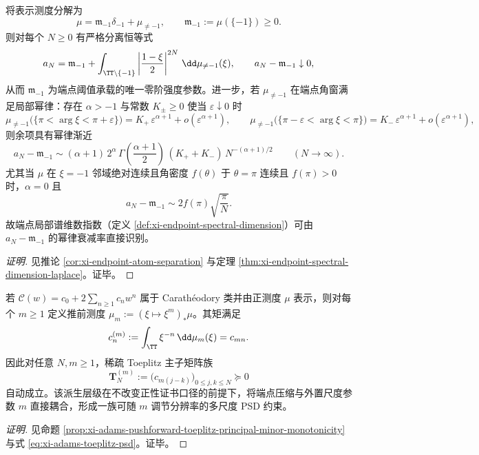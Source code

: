 \begin{conclusion}\label{con:xi-terminal-endpoint-threshold-spectral-dimension}
将表示测度分解为
\[
\mu=\mathfrak m_{-1}\delta_{-1}+\mu_{\neq -1},
\qquad
\mathfrak m_{-1}:=\mu(\{-1\})\ge 0.
\]
则对每个 \(N\ge 0\) 有严格分离恒等式
\[
a_N=\mathfrak m_{-1}+\int_{\TT\setminus\{-1\}}\left|\frac{1-\xi}{2}\right|^{2N}\,\dd\mu_{\neq-1}(\xi),
\qquad
a_N-\mathfrak m_{-1}\downarrow 0,
\]
从而 \(\mathfrak m_{-1}\) 为端点阈值承载的唯一零阶强度参数。进一步，若 \(\mu_{\neq -1}\) 在端点角窗满足局部幂律：存在 \(\alpha>-1\) 与常数 \(K_\pm\ge 0\) 使当 \(\varepsilon\downarrow 0\) 时
\[
\mu_{\neq -1}\bigl(\{\pi<\arg\xi<\pi+\varepsilon\}\bigr)=K_+\,\varepsilon^{\alpha+1}+o(\varepsilon^{\alpha+1}),
\qquad
\mu_{\neq -1}\bigl(\{\pi-\varepsilon<\arg\xi<\pi\}\bigr)=K_-\,\varepsilon^{\alpha+1}+o(\varepsilon^{\alpha+1}),
\]
则余项具有幂律渐近
\[
a_N-\mathfrak m_{-1}\sim (\alpha+1)\,2^{\alpha}\,
\Gamma\!\left(\frac{\alpha+1}{2}\right)\,
(K_++K_-)\,N^{-(\alpha+1)/2}\qquad (N\to\infty).
\]
尤其当 \(\mu\) 在 \(\xi=-1\) 邻域绝对连续且角密度 \(f(\theta)\) 于 \(\theta=\pi\) 连续且 \(f(\pi)>0\) 时，\(\alpha=0\) 且
\[
a_N-\mathfrak m_{-1}\sim 2f(\pi)\sqrt{\frac{\pi}{N}}.
\]
故端点局部谱维数指数（定义 \ref{def:xi-endpoint-spectral-dimension}）可由 \(a_N-\mathfrak m_{-1}\) 的幂律衰减率直接识别。
\end{conclusion}
\begin{proof}[证明]
见推论 \ref{cor:xi-endpoint-atom-separation} 与定理 \ref{thm:xi-endpoint-spectral-dimension-laplace}。证毕。
\end{proof}

\begin{conclusion}\label{con:xi-terminal-adams-toeplitz-psd-hierarchy}
若 \(\mathscr{C}(w)=c_0+2\sum_{n\ge 1}c_n w^n\) 属于 Carath\'eodory 类并由正测度 \(\mu\) 表示，则对每个 \(m\ge 1\) 定义推前测度 \(\mu_m:=(\xi\mapsto\xi^m)_\ast\mu\)。其矩满足
\[
c^{(m)}_n:=\int_{\TT}\xi^{-n}\,\dd\mu_m(\xi)=c_{mn}.
\]
因此对任意 \(N,m\ge 1\)，稀疏 Toeplitz 主子矩阵族
\[
\mathbf{T}^{(m)}_N:=\bigl(c_{m(j-k)}\bigr)_{0\le j,k\le N}\succeq 0
\]
自动成立。该派生层级在不改变正性证书口径的前提下，将端点压缩与外置尺度参数 \(m\) 直接耦合，形成一族可随 \(m\) 调节分辨率的多尺度 PSD 约束。
\end{conclusion}
\begin{proof}[证明]
见命题 \ref{prop:xi-adams-pushforward-toeplitz-principal-minor-monotonicity} 与式 \eqref{eq:xi-adams-toeplitz-psd}。证毕。
\end{proof}

